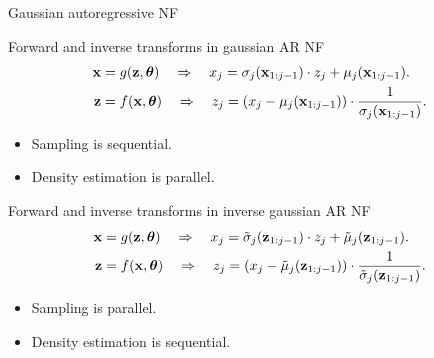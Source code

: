 \begin{frame}{Gaussian autoregressive NF}
	\begin{block}{Forward and inverse transforms in gaussian AR NF}
		\vspace{-0.6cm}
		\begin{align*}
			\mathbf{x} &= g(\mathbf{z}, \boldsymbol{\theta}) \quad \Rightarrow \quad x_j = \sigma_j (\mathbf{x}_{1:j-1}) \cdot z_j + \mu_j(\mathbf{x}_{1:j-1}). \\
			\mathbf{z} &= f(\mathbf{x}, \boldsymbol{\theta}) \quad \Rightarrow \quad z_j = \left(x_j - \mu_j(\mathbf{x}_{1:j-1}) \right) \cdot \frac{1}{\sigma_j (\mathbf{x}_{1:j-1}) }.
		\end{align*}
		\vspace{-0.6cm}
		\begin{itemize}
			\item Sampling is sequential.
			\item Density estimation is parallel.
		\end{itemize}
	\end{block}
	\begin{block}{Forward and inverse transforms in inverse gaussian AR NF}
		\vspace{-0.6cm}
		\begin{align*}
			\mathbf{x} &= g(\mathbf{z}, \boldsymbol{\theta}) \quad \Rightarrow \quad x_j = \tilde{\sigma}_j (\mathbf{z}_{1:j-1}) \cdot z_j + \tilde{\mu}_j(\mathbf{z}_{1:j-1}). \\
			\mathbf{z} &= f(\mathbf{x}, \boldsymbol{\theta}) \quad \Rightarrow \quad z_j = \left(x_j - \tilde{\mu}_j(\mathbf{z}_{1:j-1}) \right) \cdot \frac{1}{\tilde{\sigma}_j (\mathbf{z}_{1:j-1})}.
		\end{align*}
		\vspace{-0.6cm}
		\begin{itemize}
			\item Sampling is parallel.
			\item Density estimation is sequential.
		\end{itemize}
	\end{block}
\end{frame}
